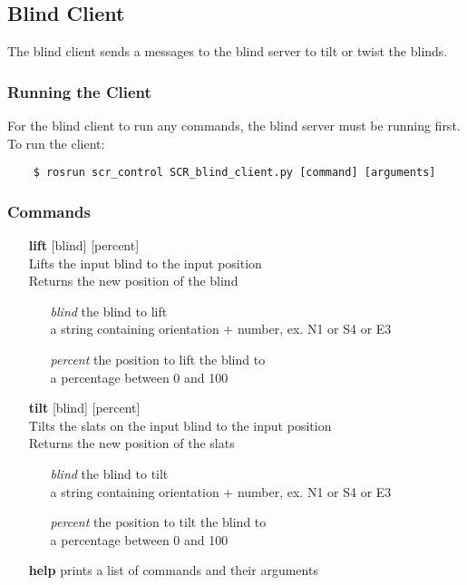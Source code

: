 \documentclass[twoside]{article}
\begin{document}
	\subsection{Blind Client}
	The blind client sends a messages to the blind server to tilt or twist the blinds.\\
	\subsubsection{Running the Client}
	For the blind client to run any commands, the blind server must be running first.\\
	To run the client:
	\begin{verbatim}
	$ rosrun scr_control SCR_blind_client.py [command] [arguments]
	\end{verbatim}
	\subsubsection{Commands}
	\begin{enumerate}
		\item[\bf lift] [blind] [percent]\\
		Lifts the input blind to the input position\\
		Returns the new position of the blind
		\begin{enumerate}[leftmargin=3\parindent]
			\item[\it blind] the blind to lift\\
			a string containing orientation + number, ex. N1 or S4 or E3
			\item[\it percent] the position to lift the blind to\\
			a percentage between 0 and 100
		\end{enumerate}
		\item[\bf tilt] [blind] [percent]\\
		Tilts the slats on the input blind to the input position\\
		Returns the new position of the slats
		\begin{enumerate}[leftmargin=3\parindent]
			\item[\it blind] the blind to tilt\\
			a string containing orientation + number, ex. N1 or S4 or E3
			\item[\it percent] the position to tilt the blind to\\
			a percentage between 0 and 100
		\end{enumerate}
		\item[\bf help] prints a list of commands and their arguments
	\end{enumerate}
	
\end{document}
